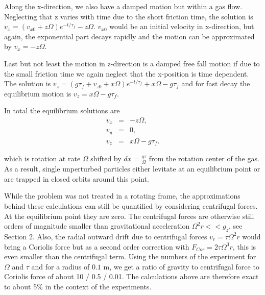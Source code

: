 {{Along the x-direction, we also have a damped motion but within a gas flow. Neglecting that z varies with time due to the short friction time, the solution is $v_x = (v_{x0} + z \Omega) e^{-t/\tau_f } - z \Omega$. $v_{x0}$ would be an initial velocity in x-direction, but again, the exponential part decays rapidly and the motion can be approximated by $v_x = - z \Omega$.} 

{ Last but not least the motion in z-direction is a damped free fall motion if due to the small friction time we again neglect that the x-position is time dependent. The solution is
$v_z = (g \tau_f + v_{z0} + x \Omega) e^{-t/\tau_f} + x \Omega - g \tau_f$ and for fast decay the equilibrium motion is
$v_z =  x \Omega - g \tau_f$.}

{ In total the equilibrium solutions are
\begin{eqnarray}
v_x &=& -z \Omega,\\
v_y &=& 0, \\
v_z &=& x \Omega - g \tau_f .
\end{eqnarray}
}

{which is rotation at rate $\Omega$ shifted by $dx = \frac{g \tau }{\Omega}$ from the rotation center of the gas.
}
As a result, single unperturbed particles either levitate at an equilibrium point or are trapped in closed orbits around  this point.}

{{While the problem was not treated in a rotating frame, the approximations behind these calculations can still be quantified by considering centrifugal forces. At the equilibrium point they are zero. The centrifugal forces are otherwise still orders of magnitude smaller than gravitational acceleration $\Omega^2 r << g_z$, see Section 2. Also, the radial outward drift due to centrifugal forces $v_r = \tau \Omega^2 r$ would bring a Coriolis force but as a second order correction with $F_{Cor} = 2 \tau \Omega^3 r$, this is even smaller than the centrifugal term. Using the numbers of the experiment for $\Omega$ and $\tau$ and for a radius of $0.1$ m, we get a ratio of gravity to centrifugal force to Coriolis force of about 10 / 0.5 / 0.01.
The calculations above are therefore exact to about 5\% in the context of the experiments.}}


